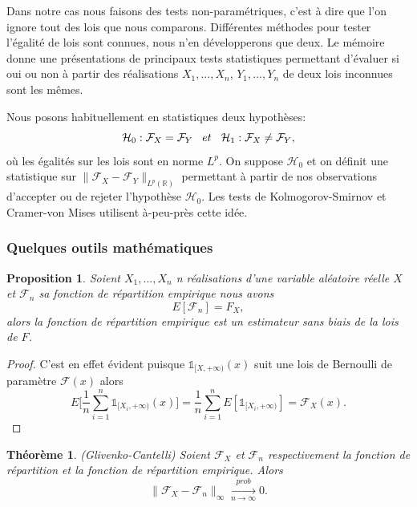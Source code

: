 \documentclass[a4paper,11pt]{article}
\newtheorem{theorem}{Théorème}[section]
\newtheorem{proposition}{Proposition}
\begin{document}
\vspace{0.7cm}

Dans notre cas nous faisons des tests non-paramétriques, c'est à dire que l'on ignore tout des lois que nous comparons.
Différentes méthodes pour tester l'égalité de lois sont connues, nous n'en développerons que deux. Le mémoire \cite{ethier2011propos} donne une présentations de principaux tests statistiques permettant d'évaluer si oui ou non à partir des réalisations $X_1,...,X_n$, $Y_1,...,Y_n$ de deux lois inconnues sont les mêmes. 

Nous posons habituellement en statistiques deux hypothèses:
\[ \mathcal{H}_0: \mathcal{F}_{X} = \mathcal{F}_{Y} \hspace{3mm} et \hspace{3mm} \mathcal{H}_1: \mathcal{F}_{X} \neq \mathcal{F}_{Y},\]
où les égalités sur les lois sont en norme $L^p$. On suppose $\mathcal{H}_0$ et on définit une statistique sur $\|\mathcal{F}_{X}-\mathcal{F}_{Y}\|_{L^p(\mathbb{R})}$ permettant à partir de nos observations d'accepter ou de rejeter l'hypothèse $\mathcal{H}_0$.
Les tests de Kolmogorov-Smirnov et Cramer-von Mises utilisent à-peu-près cette idée. 

\subsubsection{Quelques outils mathématiques}

\begin{proposition}
	\label{mean-rep-emp}
	Soient $X_1,...,X_n$ n réalisations d'une variable aléatoire réelle $X$ et $\mathcal{F}_{n}$ sa fonction de répartition empirique nous avons
	\[E[\mathcal{F}_n]=F_{X},\]
	alors la fonction de répartition empirique est un estimateur sans biais de la lois de $F$. 
\end{proposition}

\begin{proof}
	C'est en effet évident puisque $\mathds{1}_{[X, +\infty )}(x)$ suit une lois de Bernoulli de paramètre $\mathcal{F}(x)$ alors 
	\[E\Big[\frac{1}{n}\sum_{i=1}^{n}\mathds{1}_{[X_i, +\infty )}(x)\Big]= \frac{1}{n}\sum_{i=1}^{n}E[\mathds{1}_{[X_i, +\infty )}]=\mathcal{F}_{X}(x).\]
\end{proof}


\begin{theorem}(Glivenko-Cantelli)
	\label{th-glivenko}
Soient $\mathcal{F}_{X}$ et $\mathcal{F}_{n}$ respectivement la fonction de répartition et la fonction de répartition empirique. Alors 
\begin{equation}
	\|\mathcal{F}_{X}-\mathcal{F}_{n}\|_{\infty} \xrightarrow[n\to \infty]{prob} 0.
\end{equation}
\end{theorem}
\end{document}
